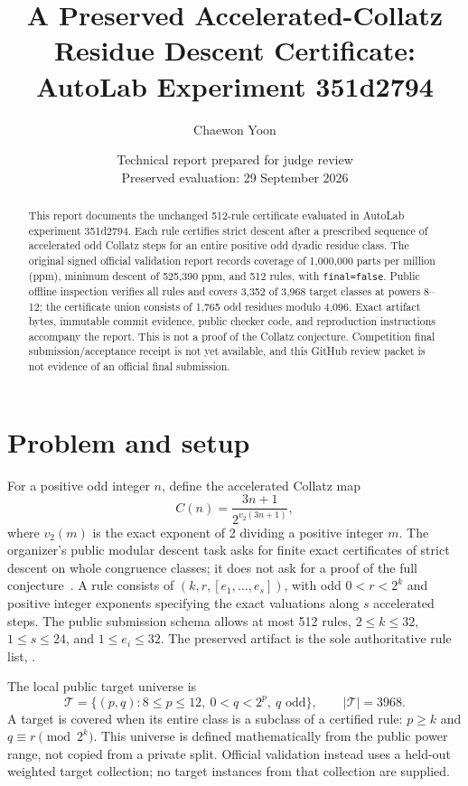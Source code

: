 \documentclass[10pt]{article}
\title{A Preserved Accelerated-Collatz Residue Descent Certificate:\\AutoLab Experiment 351d2794}
\author{Chaewon Yoon}
\date{Technical report prepared for judge review\\Preserved evaluation: 29 September 2026}
\newcommand{\file}[1]{\path{#1}}
\begin{document}
\maketitle

\begin{abstract}
This report documents the unchanged 512-rule certificate evaluated in AutoLab experiment 351d2794. Each rule certifies strict descent after a prescribed sequence of accelerated odd Collatz steps for an entire positive odd dyadic residue class. The original signed official validation report records coverage of 1,000,000 parts per million (ppm), minimum descent of 525,390 ppm, and 512 rules, with \texttt{final=false}. Public offline inspection verifies all rules and covers 3,352 of 3,968 target classes at powers 8--12; the certificate union consists of 1,765 odd residues modulo 4,096. Exact artifact bytes, immutable commit evidence, public checker code, and reproduction instructions accompany the report. This is not a proof of the Collatz conjecture. Competition final submission/acceptance receipt is not yet available, and this GitHub review packet is not evidence of an official final submission.
\end{abstract}

\section{Problem and setup}
For a positive odd integer $n$, define the accelerated Collatz map
\[
 C(n)=\frac{3n+1}{2^{v_2(3n+1)}},
\]
where $v_2(m)$ is the exact exponent of 2 dividing a positive integer $m$.
The organizer's public modular descent task asks for finite exact certificates of strict descent on whole congruence classes; it does not ask for a proof of the full conjecture~\cite{publichill}.
A rule consists of $(k,r,[e_1,\ldots,e_s])$, with odd $0<r<2^k$ and positive integer exponents specifying the exact valuations along $s$ accelerated steps. The public submission schema allows at most 512 rules, $2\leq k\leq32$, $1\leq s\leq24$, and $1\leq e_i\leq32$. The preserved artifact is the sole authoritative rule list, \file{solution.json}.

The local public target universe is
\[
 \mathcal T=\{(p,q):8\leq p\leq12,\ 0<q<2^p,\ q\text{ odd}\},
 \qquad |\mathcal T|=3968.
\]
A target is covered when its entire class is a subclass of a certified rule: $p\geq k$ and $q\equiv r\pmod{2^k}$. This universe is defined mathematically from the public power range, not copied from a private split. Official validation instead uses a held-out weighted target collection; no target instances from that collection are supplied.
\end{document}
